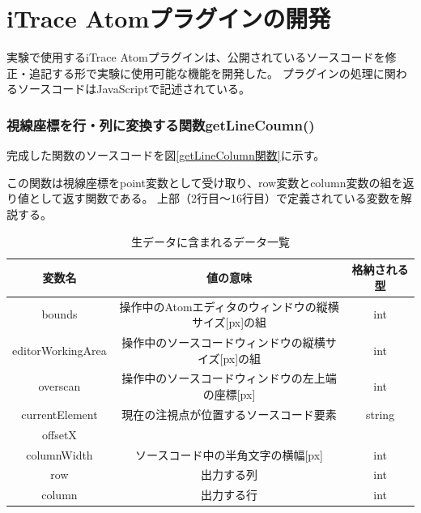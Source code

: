 \documentclass[paper=a4paper,fontsize=11pt]{jlreq}
\begin{document}
\part{iTrace Atomプラグインの開発}
  実験で使用するiTrace Atomプラグインは、公開されているソースコードを修正・追記する形で実験に使用可能な機能を開発した。
  プラグインの処理に関わるソースコードはJavaScriptで記述されている。

  \section{視線座標を行・列に変換する関数getLineCoumn()}
    完成した関数のソースコードを図\ref{getLineColumn関数}に示す。

    この関数は視線座標をpoint変数として受け取り、row変数とcolumn変数の組を返り値として返す関数である。
    上部（2行目～16行目）で定義されている変数を解説する。
    \begin{table}[h]
      \centering
      \caption{生データに含まれるデータ一覧}
      \begin{tabular}{|c|c|c|}
        \hline
        変数名 & 値の意味 & 格納される型 \\ \hline
        bounds & 操作中のAtomエディタのウィンドウの縦横サイズ[px]の組 & int \\ \hline
        editorWorkingArea & 操作中のソースコードウィンドウの縦横サイズ[px]の組 & int \\ \hline
        overscan & 操作中のソースコードウィンドウの左上端の座標[px] & int \\ \hline
        currentElement & 現在の注視点が位置するソースコード要素 & string \\ \hline
        offsetX &  & \\ \hline
        columnWidth & ソースコード中の半角文字の横幅[px] & int \\ \hline
        row & 出力する列 & int \\ \hline
        column & 出力する行 & int \\ \hline
      \end{tabular}
      \label{getLineColumn_var}
    \end{table}
    \FloatBarrier
\end{document}
